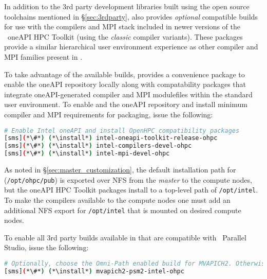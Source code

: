 In addition to the 3rd party development libraries built using the open source
toolchains mentioned in \S\ref{sec:3rdparty}, \OHPC{} also provides {\em
  optional} compatible builds for use with the compilers and MPI stack included
in newer versions of the \IntelR{}~oneAPI HPC Toolkit (using the {\em classic}
compiler variants).  These
packages provide a similar hierarchical user
environment experience as other compiler and MPI families present in \OHPC{}.

To take advantage of the available builds, \OHPC{} provides a convenience
package to enable the oneAPI repository locally along with compatability
packages that integrate oneAPI-generated compiler and MPI modulefiles within
the standard \OHPC{} user environment. To enable and the \IntelR{} oneAPI
repository and install minimum compiler and MPI requirements for \OHPC{}
packaging, issue the following:

\begin{lstlisting}[language=bash,keywords={},upquote=true,keepspaces]
# Enable Intel oneAPI and install OpenHPC compatibility packages
[sms](*\#*) (*\install*) intel-oneapi-toolkit-release-ohpc
[sms](*\#*) (*\install*) intel-compilers-devel-ohpc
[sms](*\#*) (*\install*) intel-mpi-devel-ohpc
\end{lstlisting}


\begin{center}
\begin{tcolorbox}[]
As noted in \S\ref{sec:master_customization}, the default installation path for
\OHPC{} (\texttt{/opt/ohpc/pub}) is exported over NFS from the {\em master} to the 
compute nodes, but the \IntelR{} oneAPI HPC Toolkit packages install to a top-level path of 
\texttt{/opt/intel}. To make the \IntelR{} compilers available to the compute 
nodes one must add an additional NFS export
for \texttt{/opt/intel} that is mounted on desired compute nodes.
\end{tcolorbox}
\end{center}

\noindent To enable all 3rd party builds available in \OHPC{} that are compatible with
\IntelR{}~Parallel Studio, issue the following:


\begin{lstlisting}[language=bash,keywords={},upquote=true,keepspaces]
# Optionally, choose the Omni-Path enabled build for MVAPICH2. Otherwise, skip to retain IB variant
[sms](*\#*) (*\install*) mvapich2-psm2-intel-ohpc
\end{lstlisting}

